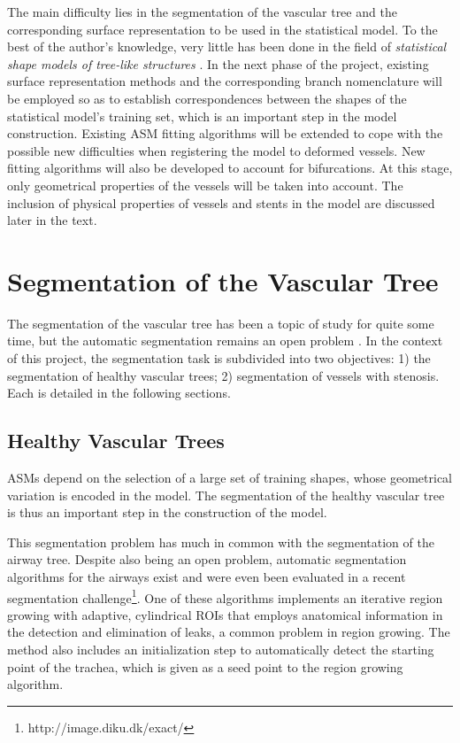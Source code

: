 The main difficulty lies in the segmentation of the vascular tree and the corresponding surface representation to be used in the statistical model. To the best of the author's knowledge, very little has been done in the field of {\em statistical shape models of tree-like structures} \citep{Feragen2011,Feragen2012}. In the next phase of the project, existing surface representation methods \citep{Florez, Antiga} and the corresponding branch nomenclature will be employed so as to establish correspondences between the shapes of the statistical model's training set, which is an important step in the model construction. Existing ASM fitting algorithms will be extended to cope with the possible new difficulties when registering the model to deformed vessels. New fitting algorithms will also be developed to account for bifurcations. At this stage, only geometrical properties of the vessels will be taken into account. The inclusion of physical properties of vessels and stents in the model are discussed later in the text. 

\section{Segmentation of the Vascular Tree}

The segmentation of the vascular tree has been a topic of study for quite some time, but the automatic segmentation remains an open problem \citep{ORKI-08}. In the context of this project, the segmentation task is subdivided into two objectives: 1) the segmentation of healthy vascular trees; 2) segmentation of vessels with stenosis. Each is detailed in the following sections.

\subsection{Healthy Vascular Trees}

\challenge

ASMs depend on the selection of a large set of training shapes, whose geometrical variation is encoded in the model. The segmentation of the healthy vascular tree is thus an important step in the construction of the model. 

\approach

This segmentation problem has much in common with the segmentation of the airway tree. Despite also being an open problem, automatic segmentation algorithms for the airways exist and were even been evaluated in a recent segmentation challenge\footnote{http://image.diku.dk/exact/}. One of these algorithms \citep{Pinho:Airways2} implements an iterative region growing with adaptive, cylindrical ROIs that employs anatomical information in the detection and elimination of leaks, a common problem in region growing. The method also includes an initialization step to automatically detect the starting point of the trachea, which is given as a seed point to the region growing algorithm. 

